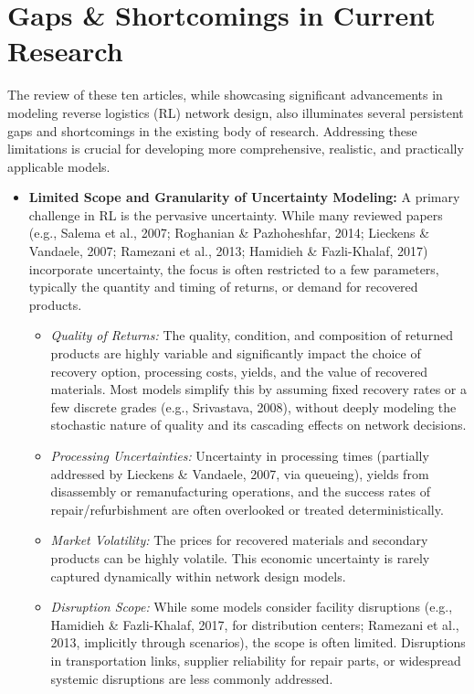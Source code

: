 \section{Gaps \& Shortcomings in Current Research}

The review of these ten articles, while showcasing significant advancements in modeling reverse logistics (RL) network design, also illuminates several persistent gaps and shortcomings in the existing body of research. Addressing these limitations is crucial for developing more comprehensive, realistic, and practically applicable models.

\begin{itemize}
    \item \textbf{Limited Scope and Granularity of Uncertainty Modeling:}
        A primary challenge in RL is the pervasive uncertainty. While many reviewed papers (e.g., Salema et al., 2007; Roghanian \& Pazhoheshfar, 2014; Lieckens \& Vandaele, 2007; Ramezani et al., 2013; Hamidieh \& Fazli-Khalaf, 2017) incorporate uncertainty, the focus is often restricted to a few parameters, typically the quantity and timing of returns, or demand for recovered products.
        \begin{itemize}
            \item \textit{Quality of Returns:} The quality, condition, and composition of returned products are highly variable and significantly impact the choice of recovery option, processing costs, yields, and the value of recovered materials. Most models simplify this by assuming fixed recovery rates or a few discrete grades (e.g., Srivastava, 2008), without deeply modeling the stochastic nature of quality and its cascading effects on network decisions.
            \item \textit{Processing Uncertainties:} Uncertainty in processing times (partially addressed by Lieckens \& Vandaele, 2007, via queueing), yields from disassembly or remanufacturing operations, and the success rates of repair/refurbishment are often overlooked or treated deterministically.
            \item \textit{Market Volatility:} The prices for recovered materials and secondary products can be highly volatile. This economic uncertainty is rarely captured dynamically within network design models.
            \item \textit{Disruption Scope:} While some models consider facility disruptions (e.g., Hamidieh \& Fazli-Khalaf, 2017, for distribution centers; Ramezani et al., 2013, implicitly through scenarios), the scope is often limited. Disruptions in transportation links, supplier reliability for repair parts, or widespread systemic disruptions are less commonly addressed.
        \end{itemize}


\end{itemize}
